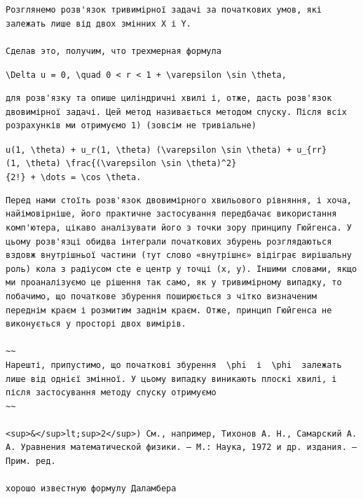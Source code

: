 \documentclass[
  ukrainian,
]{article}
\begin{document}
\begin{verbatim}
Розглянемо розв'язок тривимірної задачі за початкових умов, які залежать лише від двох змінних X і Y.

Сделав это, получим, что трехмерная формула
\end{verbatim}

\texttt{\textbackslash{}Delta\ u\ =\ 0,\ \textbackslash{}quad\ 0\ \textless{}\ r\ \textless{}\ 1\ +\ \textbackslash{}varepsilon\ \textbackslash{}sin\ \textbackslash{}theta,}

\begin{verbatim}
для розв'язку та опише циліндричні хвилі і, отже, дасть розв'язок двовимірної задачі. Цей метод називається методом спуску. Після всіх розрахунків ми отримуємо 1) (зовсім не тривіальне)
\end{verbatim}

\texttt{u(1,\ \textbackslash{}theta)\ +\ u\_r(1,\ \textbackslash{}theta)\ (\textbackslash{}varepsilon\ \textbackslash{}sin\ \textbackslash{}theta)\ +\ u\_\{rr\}(1,\ \textbackslash{}theta)\ \textbackslash{}frac\{(\textbackslash{}varepsilon\ \textbackslash{}sin\ \textbackslash{}theta)\^{}2\}\{2!\}\ +\ \textbackslash{}dots\ =\ \textbackslash{}cos\ \textbackslash{}theta.}

\begin{verbatim}
Перед нами стоїть розв'язок двовимірного хвильового рівняння, і хоча, найімовірніше, його практичне застосування передбачає використання комп'ютера, цікаво аналізувати його з точки зору принципу Гюйгенса. У цьому розв'язці обидва інтеграли початкових збурень розглядаються вздовж внутрішньої частини (тут слово «внутрішнє» відіграє вирішальну роль) кола з радіусом cte e центр у точці (x, y). Іншими словами, якщо ми проаналізуємо це рішення так само, як у тривимірному випадку, то побачимо, що початкове збурення поширюється з чітко визначеним переднім краєм і розмитим заднім краєм. Отже, принцип Гюйгенса не виконується у просторі двох вимірів.

~~
Нарешті, припустимо, що початкові збурення  \phi  і  \phi  залежать лише від однієї змінної. У цьому випадку виникають плоскі хвилі, і після застосування методу спуску отримуємо
~~

<sup>&</sup>lt;sup>2</sup>) См., например, Тихонов А. Н., Самарский А. А. Уравнения математической физики. — М.: Наука, 1972 и др. издания. — Прим. ред.

хорошо известную формулу Даламбера
\end{verbatim}
\end{document}
